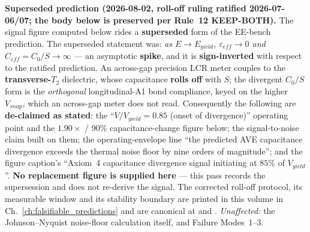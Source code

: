 \noindent\textbf{Superseded prediction (2026-08-02, roll-off ruling ratified 2026-07-06/07; the body below is preserved per Rule~12 KEEP-BOTH).} The signal figure computed below rides a \textbf{superseded} form of the EE-bench prediction. The superseded statement was: \emph{as $E \to E_{yield}$, $\varepsilon_{eff} \to 0$ and $C_{eff} = C_0/S \to \infty$} --- an asymptotic \textbf{spike}, and it is \textbf{sign-inverted} with respect to the ratified prediction. An across-gap precision LCR meter couples to the \textbf{transverse-$T_2$} dielectric, whose capacitance \textbf{rolls off} with $S$; the divergent $C_0/S$ form is the \emph{orthogonal} longitudinal-A1 bond compliance, keyed on the higher $V_{snap}$, which an across-gap meter does not read. Consequently the following are \textbf{de-claimed as stated}: the ``$V/V_{yield} = 0.85$ (onset of divergence)'' operating point and the $1.90\times$ / $90\%$ capacitance-change figure below; the signal-to-noise claim built on them; the operating-envelope line ``the predicted AVE capacitance divergence exceeds the thermal noise floor by nine orders of magnitude''; and the figure caption's ``Axiom~4 capacitance divergence signal initiating at $85\%$ of $V_{yield}$''. \textbf{No replacement figure is supplied here} --- this pass records the supersession and does not re-derive the signal. The corrected roll-off protocol, its measurable window and its stability boundary are printed in this volume in Ch.~\ref{ch:falsifiable_predictions} and are canonical at  and . \emph{Unaffected:} the Johnson--Nyquist noise-floor calculation itself, and Failure Modes~1--3.

